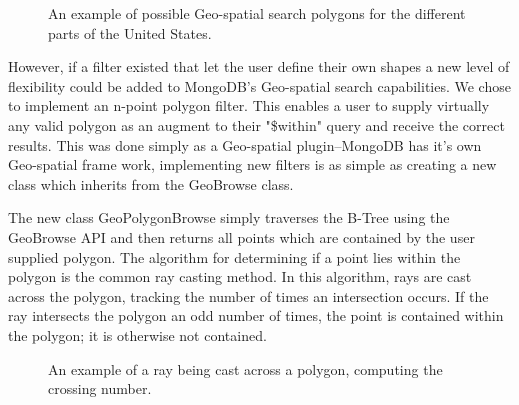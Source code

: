\documentclass{../dependencies/acm_proc_article-sp}
\begin{document}
\begin{figure}[htb]
\centering
\setlength\fboxsep{0.5pt}
\setlength\fboxrule{0.5pt}
\caption{An example of possible Geo-spatial search polygons for the different parts of the United States.}
\end{figure}
 
However, if a filter existed that let the user define their own shapes a new level of flexibility could be 
added to MongoDB's Geo-spatial search capabilities. We chose to implement an n-point polygon filter.
This enables a user to supply virtually any valid polygon as an augment to their "\$within" query and receive the correct results.
This was done simply as a Geo-spatial plugin--MongoDB has it's own Geo-spatial frame work, implementing new filters is as 
simple as creating a new class which inherits from the GeoBrowse class.



The new class GeoPolygonBrowse simply traverses the B-Tree using the GeoBrowse API and then returns
all points which are contained by the user supplied polygon. The algorithm for determining if a point 
lies within the polygon is the common ray casting method. In this algorithm, rays are cast across the polygon,
tracking the number of times an intersection occurs. 
If the ray intersects the polygon an odd number of times, the point is contained within the
polygon; it is otherwise not contained.


\begin{figure}[htb]
\centering
\setlength\fboxsep{0.5pt}
\setlength\fboxrule{0.5pt}
\caption{An example of a ray being cast across a polygon, computing the crossing number.}
\end{figure}
\end{document}
